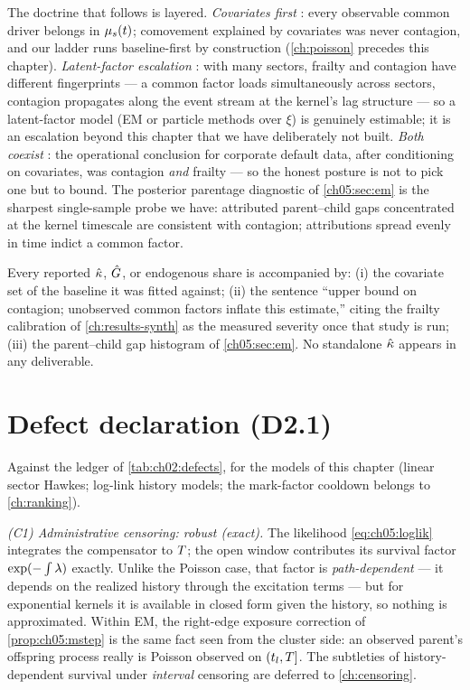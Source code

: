 The doctrine that follows is layered. \emph{Covariates first}
\citep{duffie2007}: every observable common driver belongs in
$\mu_s(t)$; comovement explained by covariates was never contagion, and
our ladder runs baseline-first by construction
(\cref{ch:poisson} precedes this chapter). \emph{Latent-factor
escalation} \citep{duffie2009}: with many sectors, frailty and contagion
have different fingerprints --- a common factor loads simultaneously
across sectors, contagion propagates along the event stream at the
kernel's lag structure --- so a latent-factor model (EM or particle
methods over $\xi$) is genuinely estimable; it is an escalation beyond
this chapter that we have deliberately not built. \emph{Both coexist}
\citep{azizpour2018}: the operational conclusion for corporate default
data, after conditioning on covariates, was contagion \emph{and} frailty
--- so the honest posture is not to pick one but to bound. The posterior
parentage diagnostic of \cref{ch05:sec:em} is the sharpest single-sample
probe we have: attributed parent--child gaps concentrated at the kernel
timescale are consistent with contagion; attributions spread evenly in
time indict a common factor.

\begin{protocol}\label{prot:ch05:upperbound}
Every reported $\hat{\kappa}$, $\hat{G}$, or endogenous share is
accompanied by: (i) the covariate set of the baseline it was fitted
against; (ii) the sentence ``upper bound on contagion; unobserved
common factors inflate this estimate,'' citing the frailty calibration of
\cref{ch:results-synth} as the measured severity once that study is run;
(iii)
the parent--child gap histogram of \cref{ch05:sec:em}. No standalone
$\hat{\kappa}$ appears in any deliverable.
\end{protocol}

\section{Defect declaration (D2.1)}\label{ch05:sec:defects}

Against the ledger of \cref{tab:ch02:defects}, for the models of this
chapter (linear sector Hawkes; log-link history models; the mark-factor
cooldown belongs to \cref{ch:ranking}).

\emph{(C1) Administrative censoring: robust (exact).} The likelihood
\cref{eq:ch05:loglik} integrates the compensator to $T$; the open
window contributes its survival factor $\exp(-\int\lambda)$ exactly. Unlike
the Poisson case, that factor is \emph{path-dependent} --- it depends on
the realized history through the excitation terms --- but for exponential
kernels it is available in closed form given the history, so nothing is
approximated. Within EM, the right-edge exposure correction of
\cref{prop:ch05:mstep} is the same fact seen from the cluster side: an
observed parent's offspring process really is Poisson observed on
$(t_l,T]$. The subtleties of history-dependent survival under
\emph{interval} censoring are deferred to \cref{ch:censoring}.

